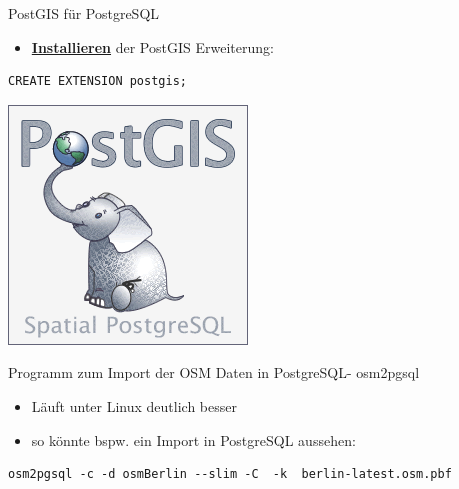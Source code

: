 \documentclass[ignorenonframetext,]{beamer}
\providecommand{\tightlist}{%
  \setlength{\itemsep}{0pt}\setlength{\parskip}{0pt}}
\begin{document}
\begin{frame}[fragile]{PostGIS für PostgreSQL}
\protect\hypertarget{postgis-fur-postgresql}{}

\begin{itemize}
\tightlist
\item
  \href{http://postgis.net/install/}{\textbf{Installieren}} der PostGIS
  Erweiterung:
\end{itemize}

\begin{verbatim}
CREATE EXTENSION postgis;
\end{verbatim}

\includegraphics{figure/PostGIS_logo.png}

\end{frame}

\begin{frame}[fragile]{Programm zum Import der OSM Daten in PostgreSQL-
osm2pgsql}
\protect\hypertarget{programm-zum-import-der-osm-daten-in-postgresql--osm2pgsql}{}

\begin{itemize}
\tightlist
\item
  Läuft unter Linux deutlich besser
\item
  so könnte bspw. ein Import in PostgreSQL aussehen:
\end{itemize}

\begin{verbatim}
osm2pgsql -c -d osmBerlin --slim -C  -k  berlin-latest.osm.pbf
\end{verbatim}

\end{frame}
\end{document}
